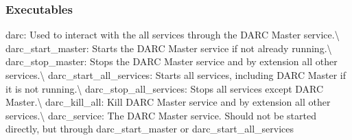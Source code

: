 \subsubsection*{Executables}

{\ttfamily darc}\+: Used to interact with the all services through the D\+A\+RC Master service.\textbackslash{} {\ttfamily darc\+\_\+start\+\_\+master}\+: Starts the D\+A\+RC Master service if not already running.\textbackslash{} {\ttfamily darc\+\_\+stop\+\_\+master}\+: Stops the D\+A\+RC Master service and by extension all other services.\textbackslash{} {\ttfamily darc\+\_\+start\+\_\+all\+\_\+services}\+: Starts all services, including D\+A\+RC Master if it is not running.\textbackslash{} {\ttfamily darc\+\_\+stop\+\_\+all\+\_\+services}\+: Stops all services except D\+A\+RC Master.\textbackslash{} {\ttfamily darc\+\_\+kill\+\_\+all}\+: Kill D\+A\+RC Master service and by extension all other services.\textbackslash{} {\ttfamily darc\+\_\+service}\+: The D\+A\+RC Master service. Should not be started directly, but through {\ttfamily darc\+\_\+start\+\_\+master} or {\ttfamily darc\+\_\+start\+\_\+all\+\_\+services} 